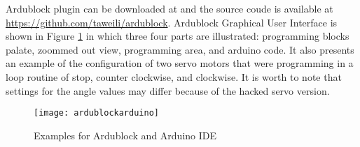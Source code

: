 Ardublock plugin can be downloaded at \cite{ardublock} and the source coude is available 
at \url{https://github.com/taweili/ardublock}. Ardublock Graphical User Interface is 
shown in Figure \ref{fig:ardublockarduino} in which three four parts are illustrated: 
programming blocks palate, zoommed out view, programming area, and arduino code. It also 
presents an example of the configuration of two servo motors that were programming in a 
loop routine of stop, counter clockwise, and clockwise. It is worth to note that settings
for the angle values may differ because of the hacked servo version.

\begin{figure}[htbp!] 
\centering    
\texttt{[image: ardublockarduino]}
\caption[PA]{Examples for Ardublock and Arduino IDE}
\label{fig:ardublockarduino}
\end{figure}
 
